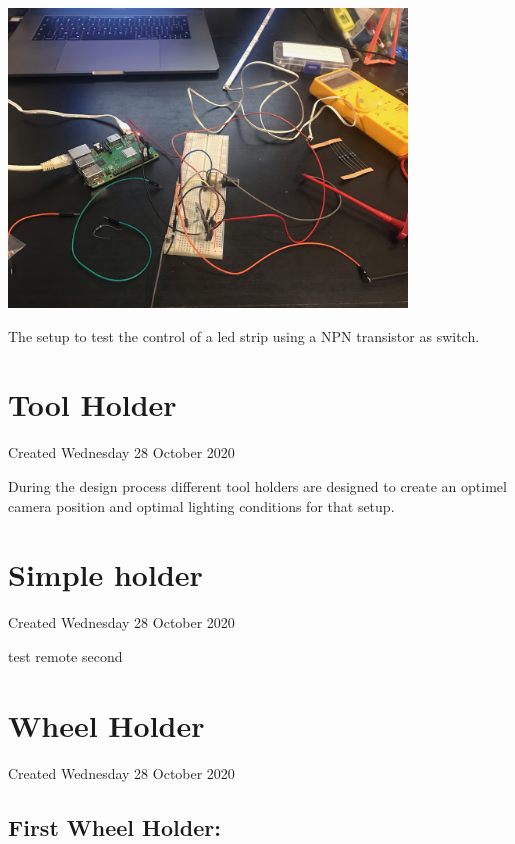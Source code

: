 \documentclass{article}
\begin{document}
\includegraphics[height=3.125000in, keepaspectratio=true]{./ZimFiles_files/Camera_setup/Light/White_Led_Strips/Test_setup_ledstrip.jpeg}

The setup to test the control of a led strip using a NPN transistor as switch.


		\section{Tool Holder}

Created Wednesday 28 October 2020



During the design process different tool holders are designed to create an optimel camera position and optimal lighting conditions for that setup.




		\section{Simple holder}

Created Wednesday 28 October 2020



test remote second


		\section{Wheel Holder}

Created Wednesday 28 October 2020



\subsection{First Wheel Holder:}
\end{document}

